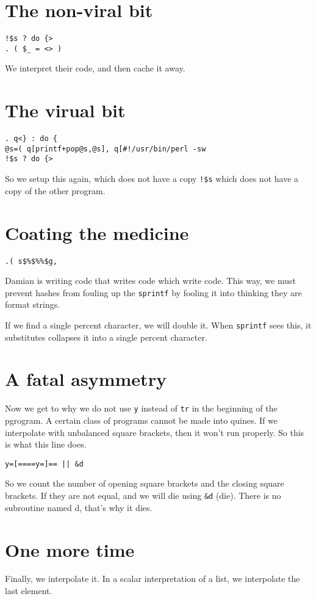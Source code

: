 \documentclass{article}
\begin{document}
\section{The non-viral bit}
\begin{verbatim}
!$s ? do {>
. ( $_ = <> )
\end{verbatim}
We interpret their code, and then cache it away.

\section{The virual bit}
\begin{verbatim}
. q<} : do {
@s=( q[printf+pop@s,@s], q[#!/usr/bin/perl -sw
!$s ? do {>
\end{verbatim}
So we setup this again, which does not have a copy \verb"!$s" which does not
have a copy of the other program.

\section{Coating the medicine}
\begin{verbatim}
.( s$%$%%$g,
\end{verbatim}
Damian is writing code that writes code which write code.  This way, we
must prevent hashes from fouling up the \verb"sprintf" by fooling it
into thinking they are format strings.

If we find a single percent character, we will double it.  When
\verb"sprintf" sees this, it substitutes collapses it into a single percent 
character.

\section{A fatal asymmetry}
Now we get to why we do not use \verb"y" instead of \verb"tr" in the
beginning of the pgrogram.  A certain class of
programs cannot be made into quines.  If we interpolate with unbalanced
square brackets, then it won't run properly.  So this is what this line
does.

\begin{verbatim}
y=[====y=]== || &d
\end{verbatim}
So we count the number of opening square brackets and the closing square
brackets.  If they are not equal, and we will die using \verb"&d" (die).
There is no subroutine named d, that's why it dies.

\section{One more time}
Finally, we interpolate it.  In a scalar interpretation of a list, we
interpolate the last element.
\end{document}
